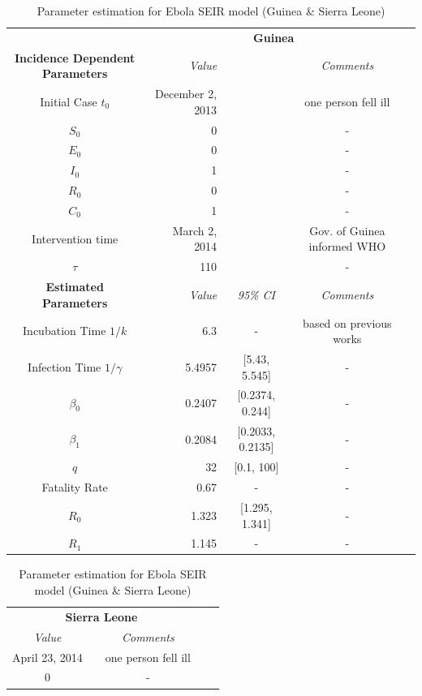 \documentclass[10pt, journal,onecolumn]{IEEEtran}
\newcommand{\ra}[1]{\renewcommand{\arraystretch}{#1}}
\begin{document}
\begin{appendix}
\begin{table}[h]
\label{Table:parameter}
\caption{Parameter estimation for Ebola SEIR model (Guinea \& Sierra Leone)} 
\centering
\tiny
\parbox{.55\linewidth}{\centering
\ra{1.3}
\begin{tabular}{@{}crccc@{}}%
& \multicolumn{3}{c}{\textbf{Guinea}} &  \\
\cmidrule{2-4}
\textbf{Incidence Dependent Parameters} & \textit{Value} && \textit{Comments} \\
\midrule
Initial Case $t_0$ & December 2, 2013 &  & one person fell ill\\
$S_0$ & 0& & -\\
$E_0$ & 0& & -\\
$I_0$ & 1& & -\\
$R_0$ & 0& & -\\
$C_0$ & 1& &-\\
Intervention time & March 2, 2014 &  & Gov. of Guinea informed WHO\\
$\tau$ &110 & & -\\
\cmidrule{2-4}
\textbf{Estimated Parameters} & \textit{Value} & \textit{95\% CI} & \textit{Comments} \\
\midrule
Incubation Time $1/k$ &6.3 & - & based on previous works \cite{}\\
Infection Time $1/\gamma$ &5.4957 & [5.43, 5.545] & -\\
$\beta_0$ &0.2407 & [0.2374, 0.244] & -\\
$\beta_1$ &0.2084 & [0.2033, 0.2135] & -\\
$q$ &32 & [0.1, 100] & -\\
Fatality Rate &0.67 & - & -\\
$R_0$ &1.323 &[1.295, 1.341] &-\\
$R_1$ &1.145 & - &-\\
\end{tabular}
}
\parbox{.3\linewidth}{
\centering
\ra{1.3}
\begin{tabular}{@{}crccc@{}}%
\multicolumn{3}{c}{\textbf{Sierra Leone}} &  \\
\cmidrule{1-3}
\textit{Value} && \textit{Comments} \\
\cmidrule{1-3}
April 23, 2014 &  & one person fell ill \cite{}\\
0& & -\\

\end{tabular}}
\end{table}
\end{appendix}
\end{document}
